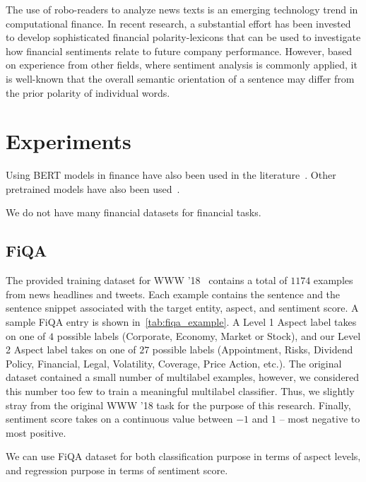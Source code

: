 \documentclass[11pt]{article}
\begin{document}
The use of robo-readers to analyze news texts is an emerging technology trend in computational finance. In recent
research, a substantial effort has been invested to develop sophisticated financial polarity-lexicons that can be used to
investigate how financial sentiments relate to future company performance. However, based on experience from other
fields, where sentiment analysis is commonly applied, it is well-known
that the overall semantic orientation of a sentence may differ from
the prior polarity of individual words.


\section{Experiments}

Using BERT models in finance have also been used in the
literature~\cite{araci2019, yang2020}. Other pretrained models have
also been used~\cite{yang2018}.

We do not have many financial datasets for financial tasks.


\subsection{FiQA}

The provided training dataset for WWW ’18~\cite{maia2018} contains a
total of $1174$ examples from news headlines and tweets. Each example
contains the sentence and the sentence snippet associated with the target entity, aspect, and sentiment score. A
sample FiQA entry is shown in~\ref{tab:fiqa_example}. A Level 1 Aspect
label takes on one of $4$ possible labels (Corporate, Economy, Market or Stock), and our Level 2 Aspect label takes on
one of $27$ possible labels (Appointment, Risks, Dividend Policy, Financial, Legal, Volatility, Coverage, Price Action, etc.). The original
dataset contained a small number of multilabel examples, however, we considered this number
too few to train a meaningful multilabel classifier. Thus, we slightly
stray from the original WWW ’18 task for the purpose of this research. Finally, sentiment score takes on a continuous value between $-1$ and $1$ – most negative to most positive.

We can use FiQA dataset for both classification purpose in terms of aspect levels, and regression purpose in terms of sentiment score.
\end{document}

